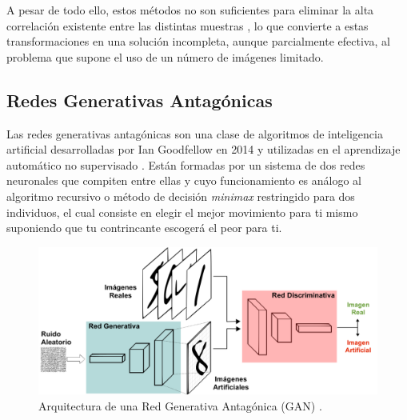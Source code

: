 A pesar de todo ello, estos métodos no son suficientes para eliminar la alta correlación existente entre las distintas muestras \cite{ZCA}, lo que convierte a estas transformaciones en una solución incompleta, aunque parcialmente efectiva, al problema que supone el uso de un número de imágenes limitado.

\subsection{Redes Generativas Antagónicas} \label{Chapter:GAN}

Las redes generativas antagónicas son una clase de algoritmos de inteligencia artificial desarrolladas por Ian Goodfellow en 2014 y utilizadas en el aprendizaje automático no supervisado \cite{GAN}. Están formadas por un sistema de dos redes neuronales que compiten entre ellas y cuyo funcionamiento es análogo al algoritmo recursivo o método de decisión \textit{minimax} restringido para dos individuos, el cual consiste en elegir el mejor movimiento para ti mismo suponiendo que tu contrincante escogerá el peor para ti. 

\begin{figure}
    \centering
    \includegraphics[width=\textwidth]{Images/GAN.png}
    \caption{Arquitectura de una Red Generativa Antagónica (GAN) \cite{img:GAN}.}
    \label{fig:GAN}
\end{figure}

